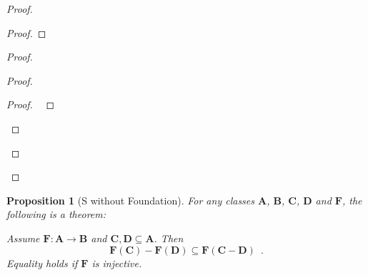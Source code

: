 \documentclass{book}
\let\qed\relax
\newtheorem{prop}[ax]{Proposition}
\theoremstyle{definition}
\begin{document}
\begin{proof}
\pf
{}
\begin{proof}
\end{proof}
\begin{proof}
	\begin{proof}
		\begin{proof}
			\pf\ 
		\end{proof}
	\end{proof}
\end{proof}
\qed
\end{proof}

\begin{prop}[S without Foundation]
\label{prop:imgdiff}
For any classes $\mathbf{A}$, $\mathbf{B}$, $\mathbf{C}$, $\mathbf{D}$ and $\mathbf{F}$, the following is a theorem:

Assume $\mathbf{F} : \mathbf{A} \rightarrow \mathbf{B}$ and $\mathbf{C}, \mathbf{D} \subseteq \mathbf{A}$. Then
\[ \mathbf{F}(\mathbf{C}) - \mathbf{F}(\mathbf{D}) \subseteq \mathbf{F}(\mathbf{C} - \mathbf{D}) \enspace . \]
Equality holds if $\mathbf{F}$ is injective.
\end{prop}
\end{document}
